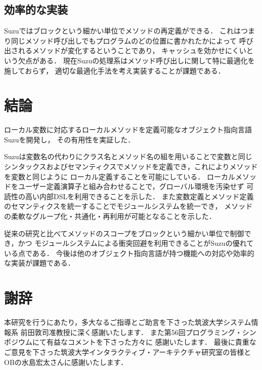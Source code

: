 \documentclass[a4paper,11pt,dvipdfmx]{jreport}
\begin{document}
\section{効率的な実装}

Suzuではブロックという細かい単位でメソッドの再定義ができる．
これはつまり同じメソッド呼び出しでもプログラムのどの位置に書かれたかによって
呼び出されるメソッドが変化するということであり，
キャッシュを効かせにくいという欠点がある．
現在Suzuの処理系はメソッド呼び出しに関して特に最適化を施しておらず，
適切な最適化手法を考え実装することが課題である．


\chapter{結論}
\label{chapter:conclusion}

ローカル変数に対応するローカルメソッドを定義可能なオブジェクト指向言語Suzuを開発し，
その有用性を実証した．

Suzuは変数名の代わりにクラス名とメソッド名の組を用いることで変数と同じ
シンタックスおよびセマンティクスでメソッドを定義でき，これによりメソッドを変数と同じように
ローカル定義することを可能にしている．
ローカルメソッドをユーザー定義演算子と組み合わせることで，グローバル環境を汚染せず
可読性の高い内部DSLを利用できることを示した．
また変数定義とメソッド定義のセマンティクスを統一することでモジュールシステムを統一でき，
メソッドの柔軟なグループ化・共通化・再利用が可能となることを示した．

従来の研究と比べてメソッドのスコープをブロックという細かい単位で制御でき，かつ
モジュールシステムによる衝突回避を利用できることがSuzuの優れている点である．
今後は他のオブジェクト指向言語が持つ機能への対応や効率的な実装が課題である．


\chapter*{謝辞}

本研究を行うにあたり，多大なるご指導とご助言を下さった筑波大学システム情報系
前田敦司准教授に深く感謝いたします．
また第56回プログラミング・シンポジウムにて有益なコメントを下さった方々に
感謝いたします．
最後に貴重なご意見を下さった筑波大学インタラクティブ・アーキテクチャ研究室の皆様と
OBの水島宏太さんに感謝いたします．

\newpage

\nocite{DesignConceptsInPL}
\nocite{Java}
\nocite{ContextJ}
\nocite{C3Linearization}
\nocite{CISCO}
\nocite{OptimizingMessageSends}
\nocite{MethodCachingForRuby}
\nocite{ShiftResetTutorial}
\nocite{ShiftResetOnMinCaml}
\nocite{ExnAndDelimCont}
\renewcommand{\bibname}{参考文献}
\end{document}
